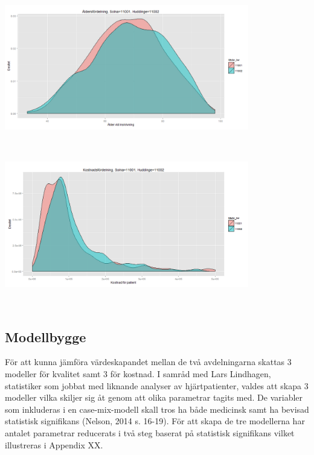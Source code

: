 \noindent\begin{minipage}{\textwidth}
\centering
\includegraphics[width=0.8\textwidth]{alder.png}
\label{fig:alder}            
\end{minipage}
\\

\noindent\begin{minipage}{\textwidth}
\centering
\includegraphics[width=0.8\textwidth]{kostnad.png}
\label{fig:kostnad}            
\end{minipage}
\\

\subsection{Modellbygge}

För att kunna jämföra värdeskapandet mellan de två avdelningarna skattas 3 modeller för kvalitet samt 3 för kostnad. I samråd med Lars Lindhagen, statistiker som jobbat med liknande analyser av hjärtpatienter, valdes att skapa 3 modeller vilka skiljer sig åt genom att olika parametrar tagits med. De variabler som inkluderas i en case-mix-modell skall tros ha både medicinsk samt ha bevisad statistisk signifikans (Nelson, 2014 s. 16-19). För att skapa de tre modellerna har antalet parametrar reducerats i två steg baserat på statistisk signifikans vilket illustreras i Appendix XX.

